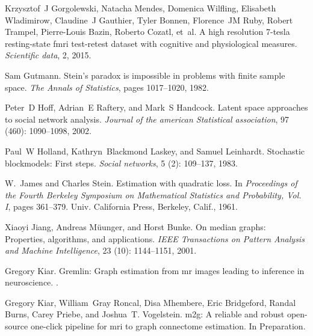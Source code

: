 \documentclass[10pt,letterpaper]{article}
\begin{document}
\begin{thebibliography}{10}
Krzysztof~J Gorgolewski, Natacha Mendes, Domenica Wilfling, Elisabeth
  Wladimirow, Claudine~J Gauthier, Tyler Bonnen, Florence~JM Ruby, Robert
  Trampel, Pierre-Louis Bazin, Roberto Cozatl, et~al.
\newblock A high resolution 7-tesla resting-state fmri test-retest dataset with
  cognitive and physiological measures.
\newblock \emph{Scientific data}, 2, 2015.

Sam Gutmann.
\newblock Stein's paradox is impossible in problems with finite sample space.
\newblock \emph{The Annals of Statistics}, pages 1017--1020, 1982.

Peter~D Hoff, Adrian~E Raftery, and Mark~S Handcock.
\newblock Latent space approaches to social network analysis.
\newblock \emph{Journal of the american Statistical association}, 97
  (460): 1090--1098, 2002.

Paul~W Holland, Kathryn~Blackmond Laskey, and Samuel Leinhardt.
\newblock Stochastic blockmodels: First steps.
\newblock \emph{Social networks}, 5 (2): 109--137, 1983.

W.~James and Charles Stein.
\newblock Estimation with quadratic loss.
\newblock In \emph{Proceedings of the {F}ourth {B}erkeley {S}ymposium on
  {M}athematical {S}tatistics and {P}robability, {V}ol. {I}}, pages 361--379.
  Univ. California Press, Berkeley, Calif., 1961.

Xiaoyi Jiang, Andreas M{\"u}unger, and Horst Bunke.
\newblock On median graphs: Properties, algorithms, and applications.
\newblock \emph{IEEE Transactions on Pattern Analysis and Machine
  Intelligence}, 23 (10): 1144--1151, 2001.

Gregory Kiar.
\newblock Gremlin: Graph estimation from mr images leading to inference in
  neuroscience.
.

Gregory Kiar, William~Gray Roncal, Disa Mhembere, Eric Bridgeford, Randal
  Burns, Carey Priebe, and Joshua~T. Vogelstein.
\newblock m2g: A reliable and robust open-source one-click pipeline for mri to
  graph connectome estimation.
\newblock In Preparation.


\end{thebibliography}
\end{document}
